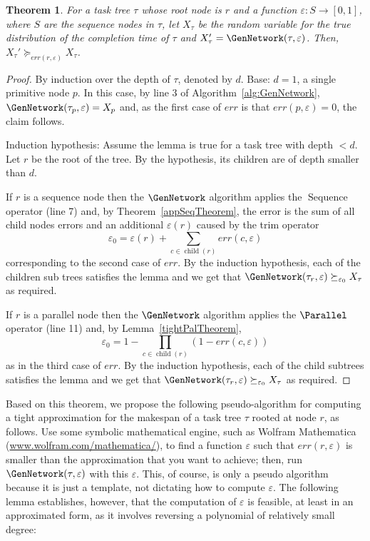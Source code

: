 \documentclass[review]{elsarticle}
\newtheorem{theorem}{Theorem}
\DeclareMathOperator{\Sequence}{Sequence}
\DeclareMathOperator{\ch}{\operatorname{child}}
\begin{document}
\begin{theorem}\label{theorem:approxEps0}
	For a task tree $\tau$ whose root node is $r$ and a function $\varepsilon\colon S \to  [0,1]$,  where $S$ are the sequence nodes in $\tau$, let $X_{\tau}$ be the random variable for the true
	distribution of the completion time of $\tau$ and $X_\tau'=\GenNetwork(\tau, \varepsilon)$. Then, $X_\tau' \succeq_{err(r,\varepsilon)} X_{\tau}$. 
\end{theorem}

\begin{proof}
By induction over the depth of $\tau$, denoted by $d$. Base: $ d=1$, a single primitive node $p$. 
In this case, by line 3 of Algorithm~\ref{alg:GenNetwork}, $\GenNetwork(\tau_p,\varepsilon)=X_p$ and, as the first case of $err$ is that $err(p,\varepsilon)=0$, the claim follows.

Induction hypothesis: Assume the lemma is true for a task tree with depth $ <d $. 
Let $r$ be the root of the tree. By the hypothesis, its children are of depth smaller than $d$.


If $r$ is a sequence node then the $\GenNetwork$ algorithm applies the $\Sequence$ operator (line 7) and, by Theorem~\ref{appSeqTheorem}, the error is the sum of all child nodes errors and an additional $\varepsilon(r)$ caused by the trim operator $$\varepsilon_0={\varepsilon(r)+\sum_{c \in \ch(r)}{err(c,\varepsilon)}}$$ corresponding to the second case of $err$. By the induction hypothesis, each of the children sub trees satisfies the lemma and we get that $\GenNetwork(\tau_{r}, \varepsilon) \succeq_{\varepsilon_0} X_\tau$ as required.

If $r$ is a parallel node then the $\GenNetwork$ algorithm applies the $\Parallel$ operator (line 11) and,
by Lemma~\ref{tightPalTheorem}, $$\varepsilon_0=1-\prod_{c \in \ch(r)}{(1-err(c,\varepsilon))}$$ as in the third case of $err$. By the induction hypothesis, each of the child subtrees satisfies the lemma and we get that $\GenNetwork(\tau_{r}, \varepsilon) \succeq_{\varepsilon_0} X_\tau$ as required.
\end{proof}


Based on this theorem, we propose the following pseudo-algorithm for computing a tight approximation for the makespan of a task tree $\tau$ rooted at node $r$, as follows. Use some symbolic mathematical engine, such as Wolfram Mathematica (\url{www.wolfram.com/mathematica/}), to find a function $\varepsilon$ such that $err(r,\varepsilon)$ is smaller than the approximation that you want to achieve; then, run $\GenNetwork(\tau,\varepsilon)$ with this $\varepsilon$. This, of course, is only a pseudo algorithm because it is just a template, not dictating how to compute $\varepsilon$.
The following lemma establishes, however, that the computation of $\varepsilon$ is feasible, at least in an approximated form, as it involves reversing a polynomial of relatively small degree:
\end{document}
